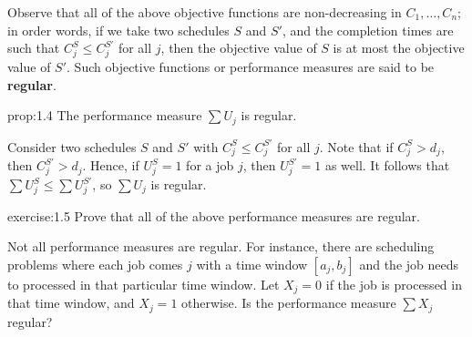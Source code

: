 Observe that all of the above objective functions are non-decreasing in 
$C_1, \dots, C_n$; in order words, if we take two schedules $S$ and $S'$, 
and the completion times are such that $C_j^S \leq C_j^{S'}$ for all 
$j$, then the objective value of $S$ is at most the objective value of $S'$. 
Such objective functions or performance measures are said to be {\bf regular}.

\begin{prop}{prop:1.4}
    The performance measure $\sum U_j$ is regular. 
\end{prop}
\begin{pf}
    Consider two schedules $S$ and $S'$ with $C_j^S \leq C_j^{S'}$ for all 
    $j$. Note that if $C_j^S > d_j$, then $C_j^{S'} > d_j$. 
    Hence, if $U_j^S = 1$ for a job $j$, then $U_j^{S'} = 1$ as well. It follows 
    that $\sum U_j^S \leq \sum U_j^{S'}$, so $\sum U_j$ is regular. 
\end{pf}

\begin{exercise}{exercise:1.5}
    Prove that all of the above performance measures are regular.
\end{exercise}

Not all performance measures are regular. For instance, there are scheduling 
problems where each job comes $j$ with a time window $[a_j, b_j]$ and the 
job needs to processed in that particular time window. Let $X_j = 0$ if the 
job is processed in that time window, and $X_j = 1$ otherwise. 
Is the performance measure $\sum X_j$ regular?
